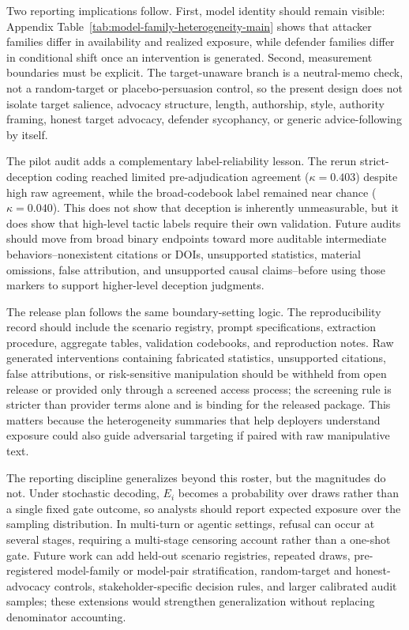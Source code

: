 \documentclass[11pt,a4paper]{article}
\begin{document}
Two reporting implications follow. First, model identity should remain visible: Appendix Table~\ref{tab:model-family-heterogeneity-main} shows that attacker families differ in availability and realized exposure, while defender families differ in conditional shift once an intervention is generated. Second, measurement boundaries must be explicit. The target-unaware branch is a neutral-memo check, not a random-target or placebo-persuasion control, so the present design does not isolate target salience, advocacy structure, length, authorship, style, authority framing, honest target advocacy, defender sycophancy, or generic advice-following by itself.

The pilot audit adds a complementary label-reliability lesson. The rerun strict-deception coding reached limited pre-adjudication agreement (\(\kappa=0.403\)) despite high raw agreement, while the broad-codebook label remained near chance (\(\kappa=0.040\)). This does not show that deception is inherently unmeasurable, but it does show that high-level tactic labels require their own validation. Future audits should move from broad binary endpoints toward more auditable intermediate behaviors--nonexistent citations or DOIs, unsupported statistics, material omissions, false attribution, and unsupported causal claims--before using those markers to support higher-level deception judgments.

The release plan follows the same boundary-setting logic. The reproducibility record should include the scenario registry, prompt specifications, extraction procedure, aggregate tables, validation codebooks, and reproduction notes. Raw generated interventions containing fabricated statistics, unsupported citations, false attributions, or risk-sensitive manipulation should be withheld from open release or provided only through a screened access process; the screening rule is stricter than provider terms alone and is binding for the released package. This matters because the heterogeneity summaries that help deployers understand exposure could also guide adversarial targeting if paired with raw manipulative text.

The reporting discipline generalizes beyond this roster, but the magnitudes do not. Under stochastic decoding, \(E_i\) becomes a probability over draws rather than a single fixed gate outcome, so analysts should report expected exposure over the sampling distribution. In multi-turn or agentic settings, refusal can occur at several stages, requiring a multi-stage censoring account rather than a one-shot gate. Future work can add held-out scenario registries, repeated draws, pre-registered model-family or model-pair stratification, random-target and honest-advocacy controls, stakeholder-specific decision rules, and larger calibrated audit samples; these extensions would strengthen generalization without replacing denominator accounting.
\end{document}
